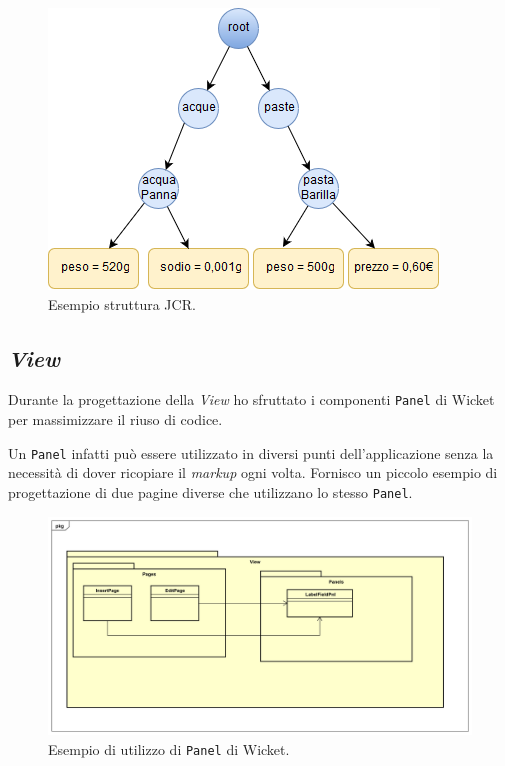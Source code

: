 		\begin{figure}[H]
			\centering
			\includegraphics[scale=0.9]{immagini/esempiostrutturajcr}
			\caption{Esempio struttura JCR.}
		\end{figure}
	
	\subsection{\textit{View}}
		Durante la progettazione della \textit{View} ho sfruttato i componenti \texttt{Panel} di Wicket per massimizzare il riuso di codice.
		
		Un \texttt{Panel} infatti può essere utilizzato in diversi punti dell'applicazione senza la necessità di dover ricopiare il \textit{markup} ogni volta. Fornisco un piccolo esempio di progettazione di due pagine diverse che utilizzano lo stesso \texttt{Panel}.
		
		\begin{figure}[H]
			\centering
			\includegraphics[width=\textwidth]{immagini/pnl}
			\caption{Esempio di utilizzo di \texttt{Panel} di Wicket.}
		\end{figure}
	
